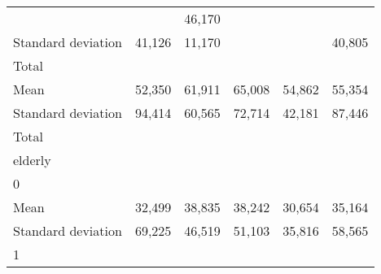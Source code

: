 \begin{tabular}{llllll}
  \multicolumn{1}{r}{} &
  \multicolumn{1}{r}{} &
  \multicolumn{1}{r}{46,170} \\
\multicolumn{1}{l}{\hspace{4em}Standard deviation} &
  \multicolumn{1}{|r}{41,126} &
  \multicolumn{1}{r}{11,170} &
  \multicolumn{1}{r}{} &
  \multicolumn{1}{r}{} &
  \multicolumn{1}{r}{40,805} \\
\multicolumn{1}{l}{\hspace{3em}Total} &
  \multicolumn{1}{|r}{} &
  \multicolumn{1}{r}{} &
  \multicolumn{1}{r}{} &
  \multicolumn{1}{r}{} &
  \multicolumn{1}{r}{} \\
\multicolumn{1}{l}{\hspace{4em}Mean} &
  \multicolumn{1}{|r}{52,350} &
  \multicolumn{1}{r}{61,911} &
  \multicolumn{1}{r}{65,008} &
  \multicolumn{1}{r}{54,862} &
  \multicolumn{1}{r}{55,354} \\
\multicolumn{1}{l}{\hspace{4em}Standard deviation} &
  \multicolumn{1}{|r}{94,414} &
  \multicolumn{1}{r}{60,565} &
  \multicolumn{1}{r}{72,714} &
  \multicolumn{1}{r}{42,181} &
  \multicolumn{1}{r}{87,446} \\
\multicolumn{1}{l}{\hspace{1em}Total} &
  \multicolumn{1}{|r}{} &
  \multicolumn{1}{r}{} &
  \multicolumn{1}{r}{} &
  \multicolumn{1}{r}{} &
  \multicolumn{1}{r}{} \\
\multicolumn{1}{l}{\hspace{2em}elderly} &
  \multicolumn{1}{|r}{} &
  \multicolumn{1}{r}{} &
  \multicolumn{1}{r}{} &
  \multicolumn{1}{r}{} &
  \multicolumn{1}{r}{} \\
\multicolumn{1}{l}{\hspace{3em}0} &
  \multicolumn{1}{|r}{} &
  \multicolumn{1}{r}{} &
  \multicolumn{1}{r}{} &
  \multicolumn{1}{r}{} &
  \multicolumn{1}{r}{} \\
\multicolumn{1}{l}{\hspace{4em}Mean} &
  \multicolumn{1}{|r}{32,499} &
  \multicolumn{1}{r}{38,835} &
  \multicolumn{1}{r}{38,242} &
  \multicolumn{1}{r}{30,654} &
  \multicolumn{1}{r}{35,164} \\
\multicolumn{1}{l}{\hspace{4em}Standard deviation} &
  \multicolumn{1}{|r}{69,225} &
  \multicolumn{1}{r}{46,519} &
  \multicolumn{1}{r}{51,103} &
  \multicolumn{1}{r}{35,816} &
  \multicolumn{1}{r}{58,565} \\
\multicolumn{1}{l}{\hspace{3em}1} &
  \multicolumn{1}{|r}{} &

\end{tabular}
